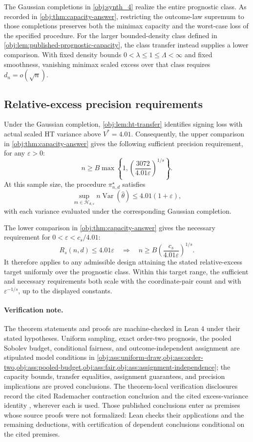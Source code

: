 The Gaussian completions in \cref{obj:synth_4} realize the entire prognostic class. As recorded in \cref{obj:thm:capacity-answer}, restricting the outcome-law supremum to those completions preserves both the minimax capacity and the worst-case loss of the specified procedure. For the larger bounded-density class defined in \cref{obj:lem:published-prognostic-capacity}, the class transfer instead supplies a lower comparison. With fixed density bounds \(0<\lambda\leq1\leq\Lambda<\infty\) and fixed smoothness, vanishing minimax scaled excess over that class requires \(d_n=o(\sqrt n)\).

\subsection{Relative-excess precision requirements}

Under the Gaussian completion, \cref{obj:lem:ht-transfer} identifies signing loss with actual scaled HT variance above \(V^*=4.01\). Consequently, the upper comparison in \cref{obj:thm:capacity-answer} gives the following sufficient precision requirement, for any \(\varepsilon>0\):
\[
n\geq B\max\left\{
1,\left(\frac{3072}{4.01\varepsilon}\right)^{1/s}
\right\}.
\]
At this sample size, the procedure \(\pi^\star_{n,d}\) satisfies
\[
\sup_{m\in\mathcal H_{d,s}}
n\operatorname{Var}(\widehat\theta)
\leq4.01(1+\varepsilon),
\]
with each variance evaluated under the corresponding Gaussian completion.

The lower comparison in \cref{obj:thm:capacity-answer} gives the necessary requirement for \(0<\varepsilon<c_s/4.01\):
\[
R_s(n,d)\leq4.01\varepsilon
\quad\Longrightarrow\quad
n\geq B\left(\frac{c_s}{4.01\varepsilon}\right)^{1/s}.
\]
It therefore applies to any admissible design attaining the stated relative-excess target uniformly over the prognostic class. Within this target range, the sufficient and necessary requirements both scale with the coordinate-pair count and with \(\varepsilon^{-1/s}\), up to the displayed constants.

\paragraph{Verification note.}
The theorem statements and proofs are machine-checked in Lean 4 under their stated hypotheses. Uniform sampling, exact order-two prognosis, the pooled Sobolev budget, conditional fairness, and outcome-independent assignment are stipulated model conditions in \cref{obj:ass:uniform-draw,obj:ass:order-two,obj:ass:pooled-budget,obj:ass:fair,obj:ass:assignment-independence}; the capacity bounds, transfer equalities, assignment guarantees, and precision implications are proved conclusions. The theorem-local verification disclosures record the cited Rademacher contraction conclusion \citep[Theorem 12(4), with Rademacher complexity as in Definition 2]{BartlettMendelson2002Complexities} and the cited excess-variance identity \citep[Proposition 2.3, equation (2.4), under Assumption 2.1 and Definition 2.2]{Cytrynbaum2026Limits}, wherever each is used. Those published conclusions enter as premises whose source proofs were not formalized: Lean checks their applications and the remaining deductions, with certification of dependent conclusions conditional on the cited premises.
